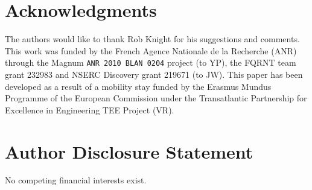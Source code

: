 \section*{Acknowledgments}
\label{sec:acknowledgments}
The authors would like to thank Rob Knight for his suggestions and comments.
This work was funded by the French Agence Nationale de la Recherche (ANR) through the {\sc Magnum} {\tt ANR 2010 BLAN 0204} 
project (to YP), the FQRNT team grant 232983 and NSERC Discovery grant 219671 (to JW).
This paper has been developed as a result of a mobility stay funded by the
Erasmus Mundus Programme of the European Commission under
the Transatlantic Partnership for Excellence in Engineering TEE
Project (VR).

\section*{Author Disclosure Statement}
No competing financial interests exist.